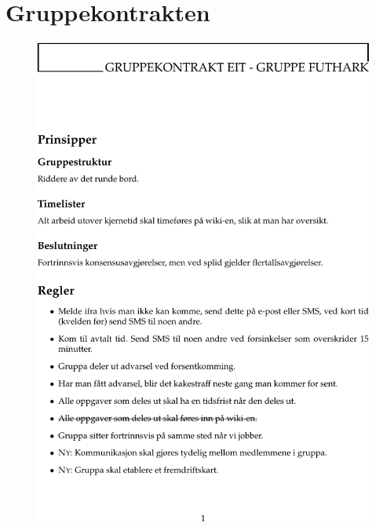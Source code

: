 \appendix
\chapter{Gruppekontrakten}
\label{avs:kontrakt}
\pagestyle{empty}
\begin{figure}[!h]
    \includegraphics[width=\textwidth]{EiTkontrakt-p1.pdf}
\end{figure}

